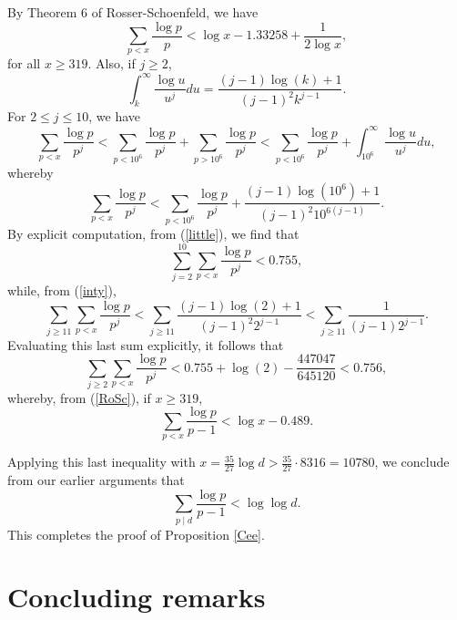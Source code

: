 By  Theorem 6 of Rosser-Schoenfeld, we have
\begin{equation} \label{RoSc}
\sum_{p < x} \frac{\log p}{p} < \log x - 1.33258 + \frac{1}{2 \log x},
\end{equation}
for all $x \geq 319$. Also, if $j \geq 2$,
\begin{equation} \label{inty}
\int_k^\infty \frac{\log u}{u^j} du = \frac{(j-1) \log (k) +1}{(j-1)^2 k^{j-1}}.
\end{equation}
For $2 \leq j \leq 10$, we have
$$
 \sum_{p < x} \frac{\log p}{p^j} <  \sum_{p < 10^6} \frac{\log p}{p^j} +  \sum_{p > 10^6} \frac{\log p}{p^j} <  \sum_{p < 10^6} \frac{\log p}{p^j}
 + \int_{10^6}^\infty \frac{\log u}{u^j} du,
 $$
 whereby
 \begin{equation} \label{little}
 \sum_{p < x} \frac{\log p}{p^j} <  \sum_{p < 10^6} \frac{\log p}{p^j} + \frac{(j-1) \log (10^6) +1}{(j-1)^2 10^{6(j-1)}}.
 \end{equation}
 By explicit computation, from (\ref{little}), we find that
 \begin{equation} \label{quip}
 \sum_{j=2}^{10}  \sum_{p < x} \frac{\log p}{p^j} < 0.755,
 \end{equation}
while, from (\ref{inty}), 
 \begin{equation} \label{quip2}
 \sum_{j \geq 11}  \sum_{p < x} \frac{\log p}{p^j} <  \sum_{j \geq 11}   \frac{(j-1) \log (2) +1}{(j-1)^2 2^{j-1}} < \sum_{j \geq 11} \frac{1}{(j-1)2^{j-1}}.
 \end{equation}
Evaluating this last sum explicitly, it follows that 
$$
\sum_{j \geq 2} \sum_{p < x} \frac{\log p}{p^j} < 0.755 + \log (2)- \frac{447047}{645120} < 0.756,
$$
whereby, from (\ref{RoSc}), if $x \geq 319$, 
$$
\sum_{p <  x} \frac{\log p}{p-1} < \log x - 0.489.
$$

Applying this last inequality with $x = \frac{35}{27} \log d > \frac{35}{27} \cdot 8316 = 10780$, we conclude from our earlier arguments that
$$
\sum_{p\mid d} \frac{\log p}{p-1} < \log \log d.
$$
This completes the  proof of Proposition \ref{Cee}.


\section{Concluding remarks} \label{conclude}


